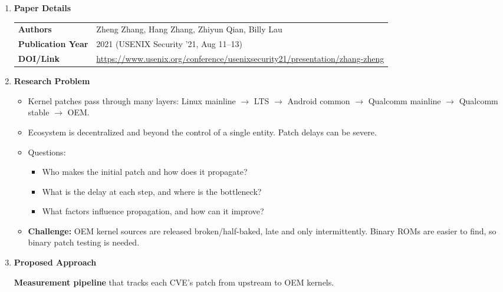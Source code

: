 \documentclass[11pt,a4paper]{article}
\newcommand{\entrypart}[1]{\textbf{\color{accent}#1}\par\vspace{2pt}}
\begin{document}
\begin{enumerate}

    \item \entrypart{Paper Details}

    \begin{tabular}{@{}>{\bfseries}p{3.2cm} p{11.5cm}@{}}
        Authors          & Zheng Zhang, Hang Zhang, Zhiyun Qian, Billy Lau \\[2pt]
        Publication Year & 2021 (USENIX Security '21, Aug 11--13) \\[2pt]
        DOI/Link         & \url{https://www.usenix.org/conference/usenixsecurity21/presentation/zhang-zheng}
    \end{tabular}

    \item \entrypart{Research Problem}

    \begin{itemize}
        \item Kernel patches pass through many layers: Linux mainline $\rightarrow$ LTS $\rightarrow$ Android common $\rightarrow$ Qualcomm mainline $\rightarrow$ Qualcomm stable $\rightarrow$ OEM.
        \item Ecosystem is decentralized and beyond the control of a single entity. Patch delays can be severe.
        \item Questions:
        \begin{itemize}
            \item Who makes the initial patch and how does it propagate?
            \item What is the delay at each step, and where is the bottleneck?
            \item What factors influence propagation, and how can it improve?
        \end{itemize}
        \item \textbf{Challenge:} OEM kernel sources are released broken/half-baked, late and only intermittently. Binary ROMs are easier to find, so binary patch testing is needed.
    \end{itemize}

    \item \entrypart{Proposed Approach}

    \textbf{Measurement pipeline} that tracks each CVE's patch from upstream to OEM kernels.


\end{enumerate}
\end{document}
